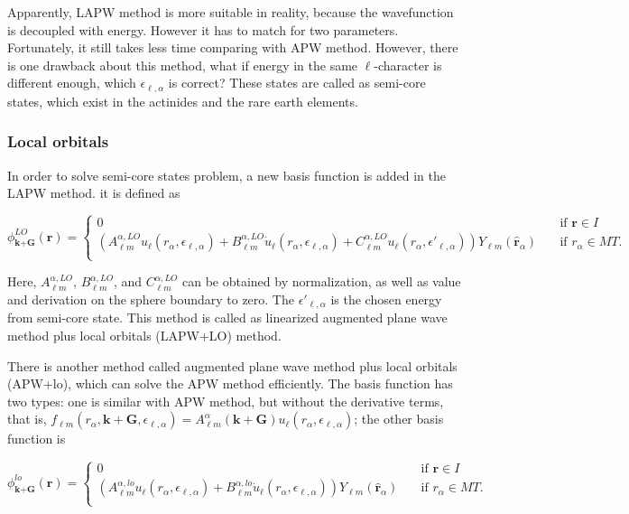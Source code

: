 \documentclass[a4paper, 12pt, titlepage,oneside,drop]{kthesis}
\begin{document}
Apparently, LAPW method is more suitable in reality, because the wavefunction is decoupled with energy. However it has to match for two parameters.
Fortunately, it still takes less time comparing with APW method. However, there is one drawback about this method, what if energy in the same ${\ell}$-character is different enough, 
which $\epsilon_{\ell,\alpha}$ is correct? These states are called as semi-core states, which exist in the actinides and the rare earth elements.

\subsubsection{Local orbitals}
In order to solve semi-core states problem, a new basis function is added in the LAPW method. it is defined as


\begin{equation}\label{lap5}
\phi^{LO}_{\textbf{k}+\textbf{G}}(\textbf{r}) = 
\begin{cases} 0 & \quad \mbox{if $\textbf{r} \in {I} $}
\\
(A _{{\ell}m}^{\alpha,LO}  u_{{\ell}}(r_{\alpha}, \epsilon_{\ell,\alpha}) + B _{{\ell}m}^{\alpha,LO}  \dot{u}_{{\ell}}(r_{\alpha}, \epsilon_{\ell,\alpha}) + C _{{\ell}m}^{\alpha,LO}  u_{{\ell}}(r_{\alpha}, \epsilon'_{\ell,\alpha})){Y_{{\ell}m}(\hat{\textbf{r}}_{\alpha})} & \quad \mbox{if $r_{\alpha} \in MT. $}\\ 
\end{cases}
\end{equation}
 

Here, $A _{{\ell}m}^{\alpha,LO}$, $B _{{\ell}m}^{\alpha,LO}$, and $C _{{\ell}m}^{\alpha,LO}$ can be obtained by normalization, as well as value and derivation on the sphere boundary to zero. The $\epsilon'_{\ell,\alpha}$ is
the chosen energy from semi-core state. This method is called as linearized augmented plane wave method plus local orbitals (LAPW+LO) method.


There is another method called augmented plane wave method plus local orbitals (APW+lo), which can solve the APW method efficiently. The 
basis function has two types: one is similar with APW method, but without the derivative terms, that is, $f_{{\ell}{m}} (r_{\alpha},\textbf{k}+\textbf{G}, \epsilon_{\ell,\alpha}) =  A _{{\ell}m}^{\alpha}(\textbf{k}+\textbf{G})u_{{\ell}}(r_{\alpha}, \epsilon_{\ell,\alpha})$; 
the other basis function is

\begin{equation}\label{lap6}
\phi^{lo}_\textbf{k+G} (\textbf{r}) = 
\begin{cases} 0 & \quad \mbox{if $\textbf{r} \in {I} $}
\\
(A _{{\ell}m}^{\alpha,lo}  u_{{\ell}}(r_{\alpha}, \epsilon_{\ell,\alpha}) + B _{{\ell}m}^{\alpha,lo}  \dot{u}_{{\ell}}(r_{\alpha}, \epsilon_{\ell,\alpha}) ){Y_{{\ell}m}(\hat{\textbf{r}}_{\alpha})} & \quad \mbox{if $r_{\alpha} \in MT. $}\\ 
\end{cases}
\end{equation}
 
\end{document}
